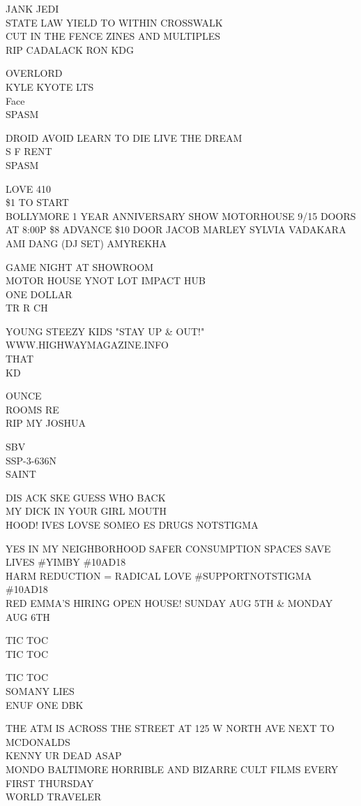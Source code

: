 \documentclass[10pt,letterpaper]{article}
\begin{document}
JANK JEDI\\
STATE LAW YIELD TO WITHIN CROSSWALK\\
CUT IN THE FENCE ZINES AND MULTIPLES\\
RIP CADALACK RON KDG

OVERLORD\\
KYLE KYOTE LTS\\
Face\\
SPASM

DROID AVOID LEARN TO DIE LIVE THE DREAM\\
S F RENT\\
SPASM

LOVE 410\\
\$1 TO START\\
BOLLYMORE 1 YEAR ANNIVERSARY SHOW MOTORHOUSE 9/15 DOORS AT 8:00P \$8 ADVANCE \$10 DOOR JACOB MARLEY SYLVIA VADAKARA AMI DANG (DJ SET) AMYREKHA

GAME NIGHT AT SHOWROOM\\
MOTOR HOUSE YNOT LOT IMPACT HUB\\
ONE DOLLAR\\
TR R CH

YOUNG STEEZY KIDS "STAY UP \& OUT!"\\
WWW.HIGHWAYMAGAZINE.INFO\\
THAT\\
KD

OUNCE\\
ROOMS RE\\
RIP MY JOSHUA

SBV\\
SSP{-}3{-}636N\\
SAINT

DIS ACK SKE GUESS WHO BACK\\
MY DICK IN YOUR GIRL MOUTH\\
HOOD!  IVES LOVSE SOMEO ES DRUGS NOTSTIGMA

YES IN MY NEIGHBORHOOD SAFER CONSUMPTION SPACES SAVE LIVES \#YIMBY \#10AD18\\
HARM REDUCTION = RADICAL LOVE \#SUPPORTNOTSTIGMA \#10AD18\\
RED EMMA'S HIRING OPEN HOUSE!   SUNDAY AUG 5TH \& MONDAY AUG 6TH

TIC TOC\\
TIC TOC

TIC TOC\\
SOMANY LIES\\
ENUF ONE DBK

THE ATM IS ACROSS THE STREET AT 125 W NORTH AVE NEXT TO MCDONALDS\\
KENNY UR DEAD ASAP\\
MONDO BALTIMORE HORRIBLE AND BIZARRE CULT FILMS EVERY FIRST THURSDAY\\
WORLD TRAVELER
\end{document}
